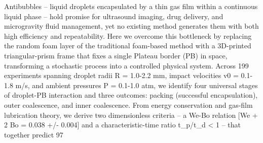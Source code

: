 Antibubbles -- liquid droplets encapsulated by a thin gas film within a continuous liquid phase -- hold promise for ultrasound imaging, drug delivery, and microgravity fluid management, yet no existing method generates them with both high efficiency and repeatability. Here we overcome this bottleneck by replacing the random foam layer of the traditional foam-based method with a 3D-printed triangular-prism frame that fixes a single Plateau border (PB) in space, transforming a stochastic process into a controlled physical system. Across 199 experiments spanning droplet radii R = 1.0-2.2 mm, impact velocities v0 = 0.1-1.8 m/s, and ambient pressures P = 0.1-1.0 atm, we identify four universal stages of droplet-PB interaction and three outcomes: packing (successful encapsulation), outer coalescence, and inner coalescence. From energy conservation and gas-film lubrication theory, we derive two dimensionless criteria -- a We-Bo relation [We + 2 Bo = 0.038 +/- 0.004] and a characteristic-time ratio t_p/t_d < 1 -- that together predict 97%
